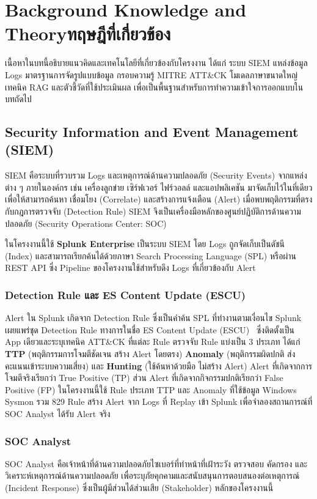 \chapter{\ifenglish Background Knowledge and Theory\else ทฤษฎีที่เกี่ยวข้อง\fi}

เนื้อหาในบทนี้อธิบายแนวคิดและเทคโนโลยีที่เกี่ยวข้องกับโครงงาน
ได้แก่ ระบบ SIEM แหล่งข้อมูล Logs มาตรฐานการจัดรูปแบบข้อมูล กรอบความรู้ MITRE ATT\&CK
โมเดลภาษาขนาดใหญ่ เทคนิค RAG และตัวชี้วัดที่ใช้ประเมินผล
เพื่อเป็นพื้นฐานสำหรับการทำความเข้าใจการออกแบบในบทถัดไป

\section{Security Information and Event Management (SIEM)}

SIEM คือระบบที่รวบรวม Logs และเหตุการณ์ด้านความปลอดภัย (Security Events)
จากแหล่งต่าง ๆ ภายในองค์กร เช่น เครื่องลูกข่าย เซิร์ฟเวอร์ ไฟร์วอลล์ และแอปพลิเคชัน
มาจัดเก็บไว้ในที่เดียว เพื่อให้สามารถค้นหา เชื่อมโยง (Correlate) และสร้างการแจ้งเตือน (Alert)
เมื่อพบพฤติกรรมที่ตรงกับกฎการตรวจจับ (Detection Rule)
SIEM จึงเป็นเครื่องมือหลักของศูนย์ปฏิบัติการด้านความปลอดภัย (Security Operations Center: SOC)

ในโครงงานนี้ใช้ \textbf{Splunk Enterprise} เป็นระบบ SIEM
โดย Logs ถูกจัดเก็บเป็นดัชนี (Index) และสามารถเรียกค้นได้ด้วยภาษา Search Processing Language (SPL)
หรือผ่าน REST API ซึ่ง Pipeline ของโครงงานใช้สำหรับดึง Logs ที่เกี่ยวข้องกับ Alert

\subsection{Detection Rule และ ES Content Update (ESCU)}
Alert ใน Splunk เกิดจาก Detection Rule ซึ่งเป็นคำค้น SPL ที่ทำงานตามเงื่อนไข
Splunk เผยแพร่ชุด Detection Rule ทางการในชื่อ ES Content Update (ESCU)~\cite{splunk-escu}
ซึ่งติดตั้งเป็น App เดียวและระบุเทคนิค ATT\&CK ที่แต่ละ Rule ตรวจจับ
Rule แบ่งเป็น 3 ประเภท ได้แก่ \textbf{TTP} (พฤติกรรมการโจมตีชัดเจน สร้าง Alert โดยตรง)
\textbf{Anomaly} (พฤติกรรมผิดปกติ ส่งคะแนนเข้าระบบความเสี่ยง) และ
\textbf{Hunting} (ใช้ค้นหาด้วยมือ ไม่สร้าง Alert)
Alert ที่เกิดจากการโจมตีจริงเรียกว่า True Positive (TP) ส่วน Alert ที่เกิดจากกิจกรรมปกติเรียกว่า False Positive (FP)
ในโครงงานนี้ใช้ Rule ประเภท TTP และ Anomaly ที่ใช้ข้อมูล Windows Sysmon รวม 829 Rule
สร้าง Alert จาก Logs ที่ Replay เข้า Splunk เพื่อจำลองสถานการณ์ที่ SOC Analyst ได้รับ Alert จริง

\subsection{SOC Analyst}
SOC Analyst คือเจ้าหน้าที่ด้านความปลอดภัยไซเบอร์ที่ทำหน้าที่เฝ้าระวัง ตรวจสอบ คัดกรอง
และวิเคราะห์เหตุการณ์ด้านความปลอดภัย เพื่อระบุภัยคุกคามและสนับสนุนการตอบสนองต่อเหตุการณ์ (Incident Response)
ซึ่งเป็นผู้มีส่วนได้ส่วนเสีย (Stakeholder) หลักของโครงงานนี้


